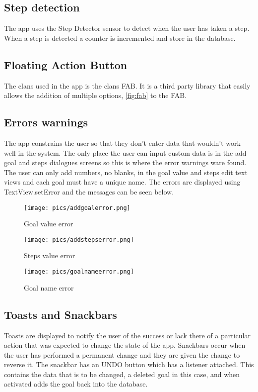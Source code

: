 \documentclass[12pt]{report}
\begin{document}
\subsection{Step detection}

The app uses the Step Detector sensor to detect when the user has taken a step. When a step is detected a counter is incremented and store in the database. 

\subsection{Floating Action Button}

The clans used in the app is the clans FAB. It is a third party library that easily allows the addition of multiple options, \ref{fig:fab} to the FAB. 

\subsection{Errors warnings}

The app constrains the user so that they don't enter data that wouldn't work well in the system. The only place the user can input custom data is in the add goal and steps dialogues screens so this is where the error warnings ware found. The user can only add numbers, no blanks, in the goal value and steps edit text views and each goal must have a unique name. The errors are displayed using TextView.setError and the messages can be seen below.


\begin{figure}[!htb]
  \texttt{[image: pics/addgoalerror.png]}
  \caption{Goal value error}
  \label{fig:addgoalerror}
\endminipage\hfill
{}
  \texttt{[image: pics/addstepserror.png]}
  \caption{Steps value error}\label{fig:addstepserror}
\endminipage\hfill
{}%
  \texttt{[image: pics/goalnameerror.png]}
  \caption{Goal name error}\label{fig:goalnameerror}
\endminipage
\end{figure}

\subsection{Toasts and Snackbars}

Toasts are displayed to notify the user of the success or lack there of a particular action that was expected to change the state of the app. Snackbars occur when the user has performed a permanent change and they are given the change to reverse it. The snackbar has an UNDO button which has a listener attached. This contains the data that is to be changed, a deleted goal in this case, and when activated adds the goal back into the database.
\end{document}
